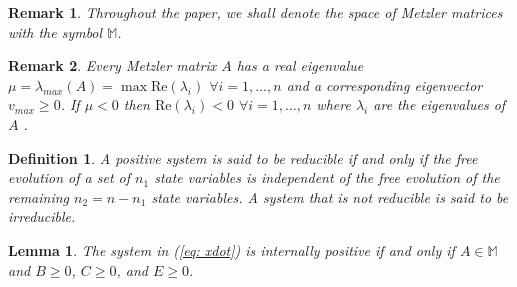 \documentclass[letterpaper, 10 pt, conference]{ieeeconf}  %
\newtheorem{lemma}{Lemma}
\newtheorem{definition}{Definition}
\newtheorem{remark}{Remark}
\def\mM{\mathbb{M}}
\def\gez{\geq 0}
\begin{document}
\begin{remark}
Throughout the paper, we shall denote the space of Metzler matrices with the symbol $\mM$.
\end{remark}

\begin{remark}
Every Metzler matrix $A$ has a real eigenvalue $\mu = \lambda_{max} (A) = \max \text{Re}{(\lambda_i)}$ $ \forall i = 1, \ldots,n$ and a corresponding eigenvector $v_{max} \geq 0$. If $\mu < 0$ then $\text{Re}{(\lambda_i)} < 0$ $\forall i = 1,\ldots,n$ where $\lambda_i$ are the eigenvalues of $A$ \cite{berman_nonnegative_1989,farina_positive_2000}.
\end{remark}


\begin{definition}
A positive system is said to be \textit{reducible} if and only if the free evolution of a set of $n_1$ state variables is independent of the free evolution of the remaining $n_2 = n - n_1$ state variables. A system that is not reducible is said to be \textit{irreducible}.
\end{definition}

\begin{lemma} \label{lem:lemIntPos}
The system in (\ref{eq: xdot}) is internally positive if and only if $A \in \mM$ and $B \gez$, $C \gez$, and $E \gez$.  
\end{lemma}
\end{document}
